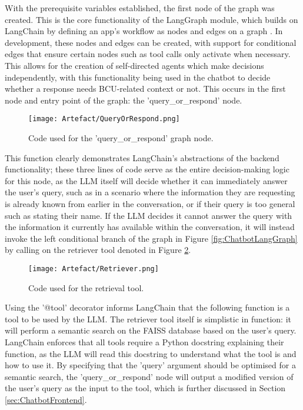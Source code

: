 \para With the prerequisite variables established, the first node of the graph was created. This is the core functionality of the LangGraph 
module, which builds on LangChain by defining an app's workflow 
as nodes and edges on a graph \autocite{langgraphLangGraph}. In development, these nodes and edges can be created, with support for conditional 
edges that ensure certain nodes such as tool calls only activate when necessary. This allows for the creation of self-directed agents which make 
decisions independently, with this functionality being used in the chatbot to decide whether a response needs BCU-related context or not. This 
occurs in the first node and entry point of the graph: the 'query\_or\_respond' node.

\begin{figure}[H]
    \centering
    \texttt{[image: Artefact/QueryOrRespond.png]}
    \caption{Code used for the 'query\_or\_respond' graph node. \label{fig:QueryOrRespond}}
\end{figure}

\noindent This function clearly demonstrates LangChain's abstractions of the backend functionality; these three lines of code
serve as the entire decision-making logic for this node, as the LLM itself will decide whether it can immediately answer the user's query,
such as in a scenario where the information they are requesting is already known from earlier in the conversation, or if their query is too 
general such as stating their name. If the LLM decides it cannot answer the query with the information it currently has available within 
the conversation, it will instead invoke the left conditional branch of the graph in Figure \ref{fig:ChatbotLangGraph} by calling on the 
retriever tool denoted in Figure \ref{fig:RetrieverTool}.

\begin{figure}[H]
    \centering
    \texttt{[image: Artefact/Retriever.png]}
    \caption{Code used for the retrieval tool. \label{fig:RetrieverTool}}
\end{figure}

\noindent Using the '@tool' decorator informs LangChain that the following function is a tool to be used by the LLM.
The retriever tool itself is simplistic 
in function: it will perform a semantic search on the FAISS database based on the user's query. LangChain enforces that all 
tools require a Python docstring explaining their function, as the LLM will read this docstring to understand what the tool 
is and how to use it. By specifying that the 'query' argument should be optimised for a semantic search, the 'query\_or\_respond'
node will output a modified version of the user's query as the input to the tool, which is further discussed in Section 
\ref{sec:ChatbotFrontend}. 

